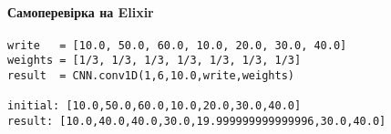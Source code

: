\documentclass{article}
\begin{document}
\paragraph{Самоперевірка на Elixir}
\begin{lstlisting}
write   = [10.0, 50.0, 60.0, 10.0, 20.0, 30.0, 40.0]
weights = [1/3, 1/3, 1/3, 1/3, 1/3, 1/3, 1/3]
result  = CNN.conv1D(1,6,10.0,write,weights)

initial: [10.0,50.0,60.0,10.0,20.0,30.0,40.0]
result: [10.0,40.0,40.0,30.0,19.999999999999996,30.0,40.0]
\end{lstlisting}
\end{document}
